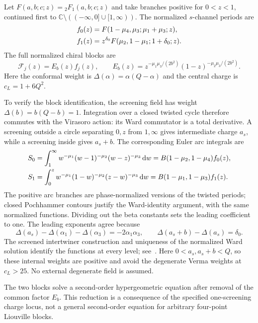 \documentclass[11pt,a4paper]{article}
\numberwithin{equation}{section}
\theoremstyle{definition}
\theoremstyle{remark}
\newcommand{\dd}{\mathop{}\!\mathrm d}
\newcommand{\CC}{\mathbb C}
\begin{document}
Let $F(a,b;c;z)={}_2F_1(a,b;c;z)$ and take branches positive
for $0<z<1$, continued first to
$\CC\setminus(({-\infty},0]\cup[1,\infty))$.
The normalized $s$-channel periods are
\begin{align}
 f_0(z)&=F(1-\mu_4,\mu_3;\mu_1+\mu_3;z),\notag\\
 f_1(z)&=z^{\delta_0}
        F(\mu_2,1-\mu_1;1+\delta_0;z).
 \label{eq:screeningsbasis}
\end{align}
The full normalized chiral blocks are
\begin{equation}
 \mathcal F_j(z)=E_b(z)f_j(z),\qquad
 E_b(z)=z^{-\mu_1\mu_3/(2b^2)}
                  (1-z)^{-\mu_2\mu_3/(2b^2)}.
 \label{eq:screeningVirasoroblocks}
\end{equation}
Here the conformal weight is $\Delta(\alpha)=\alpha(Q-\alpha)$
and the central charge is $c_L=1+6Q^2$.

To verify the block identification, the screening field has
weight $\Delta(b)=b(Q-b)=1$. Integration over a closed twisted
cycle therefore commutes with the Virasoro action: its Ward
commutator is a total derivative. A screening outside a circle
separating $0,z$ from $1,\infty$ gives intermediate charge
$a_s$, while a screening inside gives $a_s+b$.
The corresponding Euler arc integrals are
\begin{align}
 S_0&=\int_1^\infty
   w^{-\mu_1}(w-1)^{-\mu_2}(w-z)^{-\mu_3}\dd w
       =B(1-\mu_2,1-\mu_4)f_0(z),\notag\\
 S_1&=\int_0^z
   w^{-\mu_1}(1-w)^{-\mu_2}(z-w)^{-\mu_3}\dd w
       =B(1-\mu_1,1-\mu_3)f_1(z).
 \label{eq:screeningEulerarcs}
\end{align}
The positive arc branches are phase-normalized versions of
the twisted periods; closed Pochhammer contours justify the
Ward-identity argument, with the same normalized functions.
Dividing out the beta constants sets the leading coefficient
to one. The leading exponents agree because
\[
 \Delta(a_s)-\Delta(\alpha_1)-\Delta(\alpha_3)
   =-2\alpha_1\alpha_3,
 \qquad
 \Delta(a_s+b)-\Delta(a_s)=\delta_0.
\]
The screened intertwiner construction and uniqueness of the
normalized Ward solution identify the functions at every
level; see~\cite[Section~18.1, eq.~(224)]{TeschnerRevisited}.
Here $0<a_s,a_s+b<Q$, so these internal weights are positive
and avoid the degenerate Verma weights at $c_L>25$.
No external degenerate field is assumed.

The two blocks solve a second-order hypergeometric equation
after removal of the common factor $E_b$. This reduction is a
consequence of the specified one-screening charge locus, not
a general second-order equation for arbitrary four-point
Liouville blocks.
\end{document}

